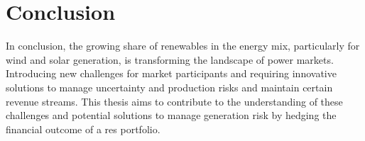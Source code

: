 \section{Conclusion}
\label{sec:intro_conclusion}

      In conclusion, the growing share of renewables in the energy mix, particularly for wind and solar generation,
  is transforming the landscape of power markets.
  Introducing new challenges for market participants and requiring innovative solutions to manage uncertainty and
  production risks and maintain certain revenue streams.
  This thesis aims to contribute to the understanding of these challenges and potential solutions
  to manage generation risk by hedging the financial outcome of a \gls{res} portfolio.

